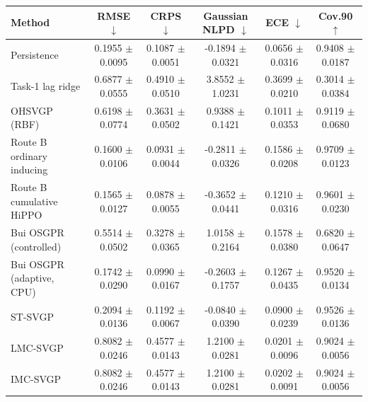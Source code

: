 \begin{tabular}{lccccc}
\toprule
Method & RMSE $\downarrow$ & CRPS $\downarrow$ & Gaussian NLPD $\downarrow$ & ECE $\downarrow$ & Cov.90 $\uparrow$ \\
\midrule
Persistence & 0.1955 $\pm$ 0.0095 & 0.1087 $\pm$ 0.0051 & -0.1894 $\pm$ 0.0321 & 0.0656 $\pm$ 0.0316 & 0.9408 $\pm$ 0.0187 \\
Task-1 lag ridge & 0.6877 $\pm$ 0.0555 & 0.4910 $\pm$ 0.0510 & 3.8552 $\pm$ 1.0231 & 0.3699 $\pm$ 0.0210 & 0.3014 $\pm$ 0.0384 \\
OHSVGP (RBF) & 0.6198 $\pm$ 0.0774 & 0.3631 $\pm$ 0.0502 & 0.9388 $\pm$ 0.1421 & 0.1011 $\pm$ 0.0353 & 0.9119 $\pm$ 0.0680 \\
Route B ordinary inducing & 0.1600 $\pm$ 0.0106 & 0.0931 $\pm$ 0.0044 & -0.2811 $\pm$ 0.0326 & 0.1586 $\pm$ 0.0208 & 0.9709 $\pm$ 0.0123 \\
Route B cumulative HiPPO & 0.1565 $\pm$ 0.0127 & 0.0878 $\pm$ 0.0055 & -0.3652 $\pm$ 0.0441 & 0.1210 $\pm$ 0.0316 & 0.9601 $\pm$ 0.0230 \\
Bui OSGPR (controlled) & 0.5514 $\pm$ 0.0502 & 0.3278 $\pm$ 0.0365 & 1.0158 $\pm$ 0.2164 & 0.1578 $\pm$ 0.0380 & 0.6820 $\pm$ 0.0647 \\
Bui OSGPR (adaptive, CPU) & 0.1742 $\pm$ 0.0290 & 0.0990 $\pm$ 0.0167 & -0.2603 $\pm$ 0.1757 & 0.1267 $\pm$ 0.0435 & 0.9520 $\pm$ 0.0134 \\
ST-SVGP & 0.2094 $\pm$ 0.0136 & 0.1192 $\pm$ 0.0067 & -0.0840 $\pm$ 0.0390 & 0.0900 $\pm$ 0.0239 & 0.9526 $\pm$ 0.0136 \\
LMC-SVGP & 0.8082 $\pm$ 0.0246 & 0.4577 $\pm$ 0.0143 & 1.2100 $\pm$ 0.0281 & 0.0201 $\pm$ 0.0096 & 0.9024 $\pm$ 0.0056 \\
IMC-SVGP & 0.8082 $\pm$ 0.0246 & 0.4577 $\pm$ 0.0143 & 1.2100 $\pm$ 0.0281 & 0.0202 $\pm$ 0.0091 & 0.9024 $\pm$ 0.0056 \\
\bottomrule
\end{tabular}

